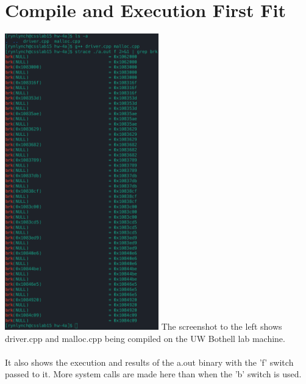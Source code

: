 \documentclass[a4paper,11pt,twoside]{article}
\begin{document}
\section*{Compile and Execution First Fit}
\label{sec:org042a45f}
\begin{multicols}{2}
\noindent
\includegraphics[width=0.5\textwidth]{ryan_f-malloc}
\noindent
The screenshot to the left shows driver.cpp and malloc.cpp being compiled on the UW Bothell lab machine.\\
\\
It also shows the execution and results of the a.out binary with the 'f' switch passed to it. More system calls are made here than when the 'b' switch is used.\\
\end{multicols}
\end{document}
